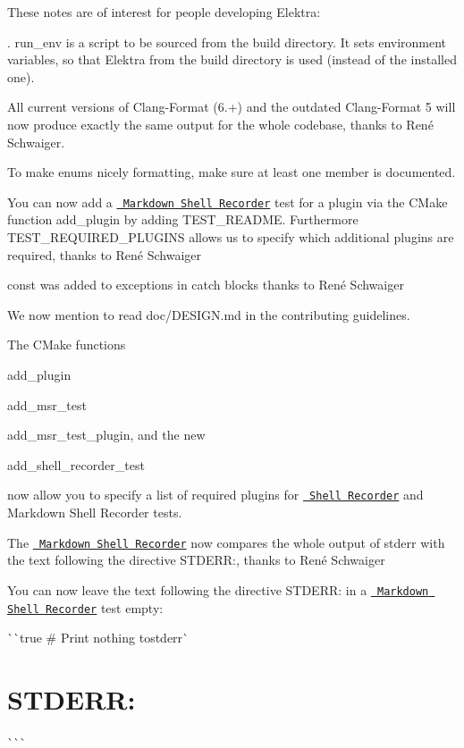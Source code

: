 These notes are of interest for people developing Elektra\+:


\begin{DoxyItemize}
\item {\ttfamily . run\+\_\+env} is a script to be sourced from the build directory. It sets environment variables, so that Elektra from the build directory is used (instead of the installed one).
\item All current versions of Clang-\/\+Format (6.+) and the outdated Clang-\/\+Format 5 will now produce exactly the same output for the whole codebase, thanks to René Schwaiger.
\item To make enums nicely formatting, make sure at least one member is documented.
\item You can now add a \href{https://master.libelektra.org/tests/shell/shell_recorder/tutorial_wrapper}{\texttt{ Markdown Shell Recorder}} test for a plugin via the C\+Make function {\ttfamily add\+\_\+plugin} by adding {\ttfamily T\+E\+S\+T\+\_\+\+R\+E\+A\+D\+ME}. Furthermore {\ttfamily T\+E\+S\+T\+\_\+\+R\+E\+Q\+U\+I\+R\+E\+D\+\_\+\+P\+L\+U\+G\+I\+NS} allows us to specify which additional plugins are required, thanks to René Schwaiger
\item {\ttfamily const} was added to exceptions in catch blocks thanks to René Schwaiger
\item We now mention to read doc/\+D\+E\+S\+I\+GN.md in the contributing guidelines.
\item The C\+Make functions
\begin{DoxyItemize}
\item {\ttfamily add\+\_\+plugin}
\item {\ttfamily add\+\_\+msr\+\_\+test}
\item {\ttfamily add\+\_\+msr\+\_\+test\+\_\+plugin}, and the new
\item {\ttfamily add\+\_\+shell\+\_\+recorder\+\_\+test}
\end{DoxyItemize}

now allow you to specify a list of required plugins for \href{https://master.libelektra.org/tests/shell/shell_recorder}{\texttt{ Shell Recorder}} and Markdown Shell Recorder tests.
\item The \href{https://master.libelektra.org/tests/shell/shell_recorder/tutorial_wrapper}{\texttt{ Markdown Shell Recorder}} now compares the whole output of {\ttfamily stderr} with the text following the directive {\ttfamily S\+T\+D\+E\+RR\+:}, thanks to René Schwaiger
\item You can now leave the text following the directive {\ttfamily S\+T\+D\+E\+RR\+:} in a \href{https://master.libelektra.org/tests/shell/shell_recorder/tutorial_wrapper}{\texttt{ Markdown Shell Recorder}} test empty\+:

\`{}\`{}{\ttfamily  true \# Print nothing to}stderr\`{} 
\end{DoxyItemize}\hypertarget{doc_news_2018-05-13_0_8_23_md_autotoc_md2207}{}\section{S\+T\+D\+E\+R\+R\+:}\label{doc_news_2018-05-13_0_8_23_md_autotoc_md2207}
\`{}\`{}\`{}

